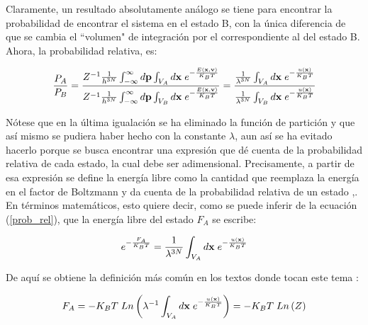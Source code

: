 \documentclass [11pt]{article}
\begin{document}
 Claramente, un resultado absolutamente análogo se tiene para encontrar la probabilidad de encontrar el sistema en el estado B, con la única diferencia de que se cambia el ``volumen" de integración por el correspondiente al del estado B. Ahora, la probabilidad relativa, es:
 
 \begin{equation}\label{prob_rel}
     \frac{P_A}{P_B}=\frac{Z^{-1} \frac{1}{h^{3N}} \int_{-\infty}^{\infty}d{\bf p}\int_{V_A}d{\bf x}{\hspace{0.1 cm}}e^{-\frac{E({\bf x},{\bf v})}{K_BT}}}{Z^{-1} \frac{1}{h^{3N}} \int_{-\infty}^{\infty}d{\bf p}\int_{V_B}d{\bf x}{\hspace{0.1 cm}}e^{-\frac{E({\bf x},{\bf v})}{K_BT}}}=\frac{\frac{1}{\lambda^{3N}}\int_{V_A}d{\bf x}{\hspace{0.1 cm}}e^{-\frac{u({\bf x})}{K_BT}}}{\frac{1}{\lambda^{3N}}\int_{V_B}d{\bf x}{\hspace{0.1 cm}}e^{-\frac{u({\bf x})}{K_BT}}}
 \end{equation}
 
 Nótese que en la última igualación se ha eliminado la función de partición y que así mismo se pudiera haber hecho con la constante $\lambda$, aun así se ha evitado hacerlo porque se busca encontrar una expresión que dé cuenta de la probabilidad relativa de cada estado, la cual debe ser adimensional. Precisamente, a partir de esa expresión se define la energía libre como la cantidad que reemplaza la energía en el factor de Boltzmann y da cuenta de la probabilidad relativa de un estado \cite{zukerman},. En términos matemáticos, esto quiere decir, como se puede inferir de la ecuación  (\ref{prob_rel}), que la energía libre del estado $F_A$ se escribe:
 
 \begin{equation}
     e^{-\frac{F_A}{K_BT}}=\frac{1}{\lambda^{3N}}\int_{V_A}d{\bf x}{\hspace{0.1 cm}}e^{-\frac{u({\bf x})}{K_BT}}
 \end{equation}
 
De aquí se obtiene la definición más común en los textos donde tocan este tema \cite{haile}:

\begin{equation}
    F_A=-K_BT\hspace{0.1 cm}Ln\left(\lambda^{-1}\int_{V_A}d{\bf x}{\hspace{0.1 cm}}e^{-\frac{u({\bf x})}{K_BT}}\right)=-K_BT\hspace{0.1 cm}Ln\left(Z\right)
\end{equation}
\end{document}
